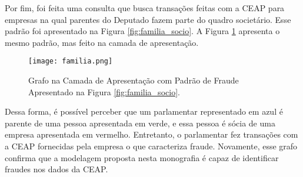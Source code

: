 Por fim, foi feita uma consulta que busca transações feitas com a CEAP para empresas na qual parentes do Deputado fazem parte do quadro societário. Esse padrão foi apresentado na Figura \ref{fig:familia_socio}. A Figura \ref{fig:familia_grafo} apresenta o mesmo padrão, mas feito na camada de apresentação.

\begin{figure}[H]
\centering
\texttt{[image: familia.png]}
\caption{Grafo na Camada de Apresentação com Padrão de Fraude Apresentado na Figura \ref{fig:familia_socio}.}
\label{fig:familia_grafo}
\end{figure}

Dessa forma, é possível perceber que um parlamentar representado em azul é parente de uma pessoa apresentada em verde, e essa pessoa é sócia de uma empresa apresentada em vermelho. Entretanto, o parlamentar fez transações com a CEAP fornecidas pela empresa o que caracteriza fraude. Novamente, esse grafo confirma que a modelagem proposta nesta monografia é capaz de identificar fraudes nos dados da CEAP. 